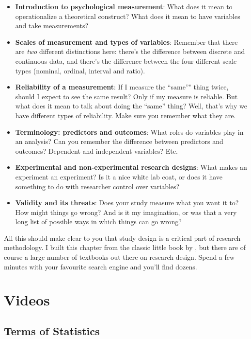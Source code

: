 \documentclass[
]{book}
\begin{document}
\begin{itemize}
\item
  \textbf{Introduction to psychological measurement}: What does it mean to operationalize a theoretical construct? What does it mean to have variables and take measurements?
\item
  \textbf{Scales of measurement and types of variables}: Remember that there are \emph{two} different distinctions here: there's the difference between discrete and continuous data, and there's the difference between the four different scale types (nominal, ordinal, interval and ratio).
\item
  \textbf{Reliability of a measurement}: If I measure the ``same''" thing twice, should I expect to see the same result? Only if my measure is reliable. But what does it mean to talk about doing the ``same'' thing? Well, that's why we have different types of reliability. Make sure you remember what they are.
\item
  \textbf{Terminology: predictors and outcomes}: What roles do variables play in an analysis? Can you remember the difference between predictors and outcomes? Dependent and independent variables? Etc.
\item
  \textbf{Experimental and non-experimental research designs}: What makes an experiment an experiment? Is it a nice white lab coat, or does it have something to do with researcher control over variables?
\item
  \textbf{Validity and its threats}: Does your study measure what you want it to? How might things go wrong? And is it my imagination, or was that a very long list of possible ways in which things can go wrong?
\end{itemize}

All this should make clear to you that study design is a critical part of research methodology. I built this chapter from the classic little book by \citet{Campbell1963}, but there are of course a large number of textbooks out there on research design. Spend a few minutes with your favourite search engine and you'll find dozens.

\hypertarget{videos}{%
\section{Videos}\label{videos}}

\hypertarget{terms-of-statistics}{%
\subsection{Terms of Statistics}\label{terms-of-statistics}}
\end{document}
